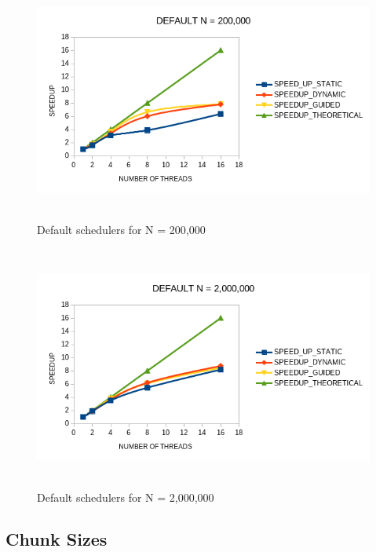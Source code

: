\documentclass[12pt]{article}
\begin{document}
        \begin{figure}[H]
            \hfill\includegraphics[width=150mm,height= 80mm]{speedup_2e5.png}\hspace*{\fill}
            \caption{Default schedulers for N = 200,000}
        \end{figure}        

        \begin{figure}[H]
            \hfill\includegraphics[width=150mm,height= 80mm]{speedup_2e6.png}\hspace*{\fill}
            \caption{Default schedulers for N = 2,000,000}
        \end{figure}        
        \newpage
        \subsection{Chunk Sizes}
\end{document}
